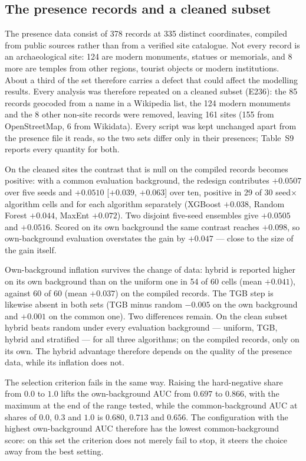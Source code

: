 \documentclass[12pt]{article}
\begin{document}
\subsection{The presence records and a cleaned subset}
\label{sec:presence}

The presence data consist of 378 records at 335 distinct coordinates, compiled from public sources rather than from a verified site catalogue.
Not every record is an archaeological site: 124 are modern monuments, statues or memorials, and 8 more are temples from other regions, tourist objects or modern institutions.
About a third of the set therefore carries a defect that could affect the modelling results.
Every analysis was therefore repeated on a cleaned subset (E236): the 85 records geocoded from a name in a Wikipedia list, the 124 modern monuments and the 8 other non-site records were removed, leaving 161 sites (155 from OpenStreetMap, 6 from Wikidata).
Every script was kept unchanged apart from the presence file it reads, so the two sets differ only in their presences; Table~S9 reports every quantity for both.

On the cleaned sites the contrast that is null on the compiled records becomes positive: with a common evaluation background, the redesign contributes $+0.0507$ over five seeds and $+0.0510$ [$+0.039$, $+0.063$] over ten, positive in 29 of 30 seed$\times$algorithm cells and for each algorithm separately (XGBoost $+0.038$, Random Forest $+0.044$, MaxEnt $+0.072$).
Two disjoint five-seed ensembles give $+0.0505$ and $+0.0516$.
Scored on its own background the same contrast reaches $+0.098$, so own-background evaluation overstates the gain by $+0.047$ --- close to the size of the gain itself.

Own-background inflation survives the change of data: hybrid is reported higher on its own background than on the uniform one in 54 of 60 cells (mean $+0.041$), against 60 of 60 (mean $+0.037$) on the compiled records.
The TGB step is likewise absent in both sets (TGB minus random $-0.005$ on the own background and $+0.001$ on the common one).
Two differences remain.
On the clean subset hybrid beats random under every evaluation background --- uniform, TGB, hybrid and stratified --- for all three algorithms; on the compiled records, only on its own.
The hybrid advantage therefore depends on the quality of the presence data, while its inflation does not.

The selection criterion fails in the same way.
Raising the hard-negative share from $0.0$ to $1.0$ lifts the own-background AUC from $0.697$ to $0.866$, with the maximum at the end of the range tested, while the common-background AUC at shares of $0.0$, $0.3$ and $1.0$ is $0.680$, $0.713$ and $0.656$.
The configuration with the highest own-background AUC therefore has the lowest common-background score: on this set the criterion does not merely fail to stop, it steers the choice away from the best setting.
\end{document}
